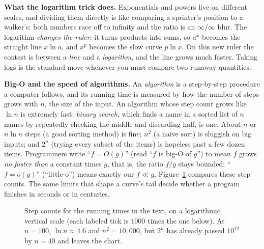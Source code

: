 \begin{happeningbox}
\textbf{What the logarithm trick does.} Exponentials and powers live
on different scales, and dividing them directly is like comparing a sprinter's
position to a walker's: both numbers race off to infinity and the ratio is an
$\infty/\infty$ blur. The logarithm \emph{changes the ruler}: it turns
products into sums, so $a^x$ becomes the straight line
$x\ln a$, and $x^p$ becomes the slow curve $p\ln x$. On this new ruler the contest
is between a \emph{line} and a \emph{logarithm}, and the line grows much faster.
Taking logs is the standard move whenever you must compare two runaway
quantities.
\end{happeningbox}

\begin{connectionbox}
\textbf{Big-O and the speed of algorithms.} An \emph{algorithm} is a
step-by-step procedure a computer follows, and its running time is measured by
how the number of steps grows with $n$, the size of the input. An algorithm whose
step count grows like $\ln n$ is extremely fast; \emph{binary search}, which finds a
name in a sorted list of $n$ names by repeatedly checking the middle and
discarding half, is one. About $n$ or $n\ln n$ steps (a good sorting method) is
fine; $n^2$ (a naive sort) is sluggish on
big inputs; and $2^n$ (trying every subset of the items) is hopeless past a few dozen
items. Programmers write ``$f = O(g)$'' (read ``$f$ is big-O of $g$'') to mean
$f$ grows \emph{no faster than} a constant
times $g$, that is, the ratio $f/g$ stays bounded; ``$f = o(g)$'' (``little-o'')
means exactly our $f\ll g$.
Figure~\ref{ch09:fig-bigo} compares these step counts.
The same limits that shape a curve's tail decide whether a program finishes
in seconds or in centuries.
\end{connectionbox}

\begin{figure}[htbp]
\centering
{}
\caption{Step counts for the running times in the text, on a logarithmic
vertical scale (each labeled tick is $1000$ times the one below). At $n=100$,
$\ln n\approx 4.6$ and $n^2=10{,}000$, but $2^n$ has already passed $10^{12}$
by $n=40$ and leaves the chart.}
\label{ch09:fig-bigo}
\end{figure}

